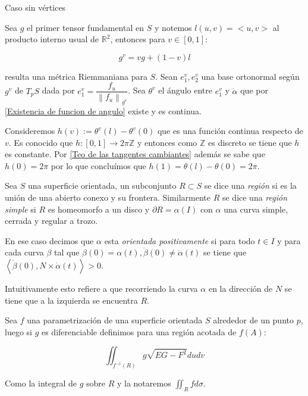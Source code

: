 \documentclass[11pt]{article}
\newcommand{\Z}{\mathbb{Z}}
\newcommand{\R}{{\mathbb{R}}}
\newcommand\norm[1]{\left\lVert#1\right\rVert}
\newcommand\ip[1]{\left\langle#1\right\rangle}
\newenvironment{proof}[1][Demostraci\'on]{\begin{trivlist}
		\item[\hskip \labelsep {\bfseries #1}]}{\end{trivlist}}
\newenvironment{definition}[1][Definici\'on]{\begin{trivlist}
		\item[\hskip \labelsep {\bfseries #1}]}{\end{trivlist}}
\newcommand{\qed}{\nobreak \ifvmode \relax \else
	\ifdim\lastskip<1.5em \hskip-\lastskip
	\hskip1.5em plus0em minus0.5em \fi \nobreak
	\vrule height0.75em width0.5em depth0.25em\fi}
\begin{document}
\begin{proof}{Caso sin v\'ertices}
	
	Sea $g$ el primer tensor fundamental en $S$ y notemos $l(u,v) = <u,v>$ al producto interno usual de $\R^2$, entonces para $v \in [0,1]$:
	
	\[
		g^{v} = vg + (1-v)l
	\]
	
	resulta una m\'etrica Riemmaniana para $S$. Sean $e_{1}^{v},e_{2}^{v}$ una base ortonormal seg\'un $g^v$ de $T_pS$ dada por $e_{1}^{v} = \dfrac{f_u}{\norm{f_u}_{g^v}}$. Sea $\theta^v$ el \'angulo entre $e_{1}^{v}$ y $\dot{\alpha}$ que por \ref{Existencia de funcion de angulo} existe y es continua.
	
	Consideremos $h(v) := \theta^{v}(l) - \theta^{v}(0)$ que es una funci\'on continua respecto de $v$. Es conocido que $h : [0,1] \rightarrow 2\pi\Z$ y entonces como $\Z$ es discreto se tiene que $h$ es constante. Por \ref{Teo de las tangentes cambiantes} adem\'as se sabe que $h(0)=2 \pi$ por lo que conclu\'imos que $h(1) = \theta(l) - \theta(0) = 2\pi$. \qed
	
\end{proof}

\begin{definition}
	Sea $S$ una superficie orientada, un subconjunto $R \subset S$ se dice una \textit{regi\'on} si es la uni\'on de una abierto conexo y su frontera. Similarmente $R$ se dice una \textit{regi\'on simple} si $R$ es homeomorfo a un disco y $\partial R = \alpha(I)$ con $\alpha$ una curva simple, cerrada y regular a trozo.
	
	En ese caso decimos que $\alpha$ esta \textit{orientada positivamente} si para todo $t \in I$ y para cada curva $\beta$ tal que $\beta(0) = \alpha(t), \dot{\beta}(0) \neq \dot{\alpha}(t)$ se tiene que $\ip{\dot{\beta}(0) , N \times \dot{\alpha}(t)} > 0$. 
	
\end{definition}

Intuitivamente esto refiere a que recorriendo la curva $\alpha$ en la direcci\'on de $N$ se tiene que a la izquierda se encuentra $R$.

\begin{definition}
	
	Sea $f$ una parametrizaci\'on de una superficie orientada $S$ alrededor de un punto $p$, luego si $g$ es diferenciable definimos para una regi\'on acotada de $f(A)$:
	
	\[
	\iint_{f^{-1}(R)}{g\sqrt{EG-F^2} dudv}
	\]
	
	Como la integral de $g$ sobre $R$ y la notaremos $\iint_{R}fd\sigma$. 
	
\end{definition}
\end{document}
